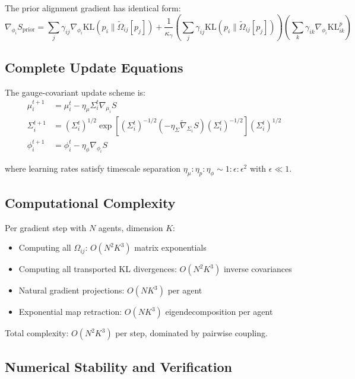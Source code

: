 \documentclass[11pt]{article}
\begin{document}
The prior alignment gradient has identical form:
\begin{equation}
\nabla_{\phi_i} S_{\mathrm{prior}} = \sum_j \gamma_{ij}\nabla_{\phi_i}\mathrm{KL}(p_i \| \tilde{\Omega}_{ij}[p_j]) + \frac{1}{\kappa_\gamma}\left(\sum_j \gamma_{ij}\mathrm{KL}(p_i \| \tilde{\Omega}_{ij}[p_j])\right)\left(\sum_k \gamma_{ik}\nabla_{\phi_i}\mathrm{KL}_{ik}^p\right)
\end{equation}

\subsection*{Complete Update Equations}

The gauge-covariant update scheme is:
\begin{align}
\mu_i^{t+1} &= \mu_i^t - \eta_\mu \Sigma_i^t \nabla_{\mu_i} S \\
\Sigma_i^{t+1} &= \left(\Sigma_i^t\right)^{1/2} \exp\left[\left(\Sigma_i^t\right)^{-1/2}\left(-\eta_\Sigma \tilde{\nabla}_{\Sigma_i} S\right)\left(\Sigma_i^t\right)^{-1/2}\right] \left(\Sigma_i^t\right)^{1/2} \\
\phi_i^{t+1} &= \phi_i^t - \eta_\phi \nabla_{\phi_i} S
\end{align}

where learning rates satisfy timescale separation $\eta_\mu : \eta_p : \eta_\phi \sim 1 : \epsilon : \epsilon^2$ with $\epsilon \ll 1$.

\subsection*{Computational Complexity}

Per gradient step with $N$ agents, dimension $K$:
\begin{itemize}
\item Computing all $\Omega_{ij}$: $O(N^2 K^3)$ matrix exponentials
\item Computing all transported KL divergences: $O(N^2 K^3)$ inverse covariances
\item Natural gradient projections: $O(NK^3)$ per agent
\item Exponential map retraction: $O(NK^3)$ eigendecomposition per agent
\end{itemize}

Total complexity: $O(N^2 K^3)$ per step, dominated by pairwise coupling.

\subsection*{Numerical Stability and Verification}
\end{document}
